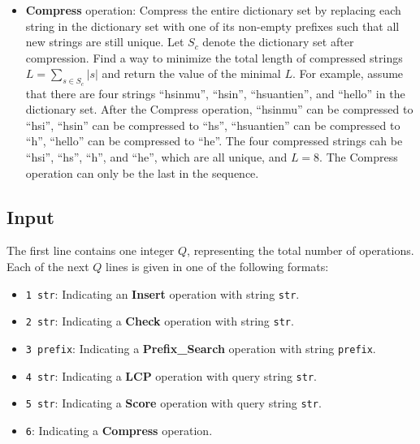 \begin{itemize}
    \item \textbf{Compress} operation: Compress the entire dictionary set by replacing each string in the dictionary set with one of its non-empty prefixes such that all new strings are still unique. 
    Let $S_c$ denote the dictionary set after compression. Find a way to minimize the total length of compressed strings $L=\sum_{s\in S_c} |s| $ and return the value of the minimal $L$.
    For example, assume that there are four strings ``hsinmu'', ``hsin'', ``hsuantien'', and ``hello'' in the dictionary set. After the Compress operation, ``hsinmu'' can be compressed to ``hsi'', ``hsin'' can be compressed to ``hs'', ``hsuantien'' can be compressed to ``h'', ``hello'' can be compressed to ``he''. The four compressed strings cah be ``hsi'', ``hs'', ``h'', and ``he'', which are all unique, and $L=8$. 
    The Compress operation can only be the last in the sequence. 

\end{itemize}

\subsection{Input}\label{input}

The first line contains one integer $Q$, representing the total number of operations. Each of the next $Q$ lines is given in one of the following formats:
\begin{itemize}
    \item \texttt{1 str}: Indicating an \textbf{Insert} operation with string \texttt{str}.
    \item \texttt{2 str}: Indicating a \textbf{Check} operation with string \texttt{str}.
    \item \texttt{3 prefix}: Indicating a \textbf{Prefix\_Search} operation with string \texttt{prefix}.
    \item \texttt{4 str}: Indicating a \textbf{LCP} operation with query string \texttt{str}.
    \item \texttt{5 str}: Indicating a \textbf{Score} operation with query string \texttt{str}.
    \item \texttt{6}: Indicating a \textbf{Compress} operation.
\end{itemize}

